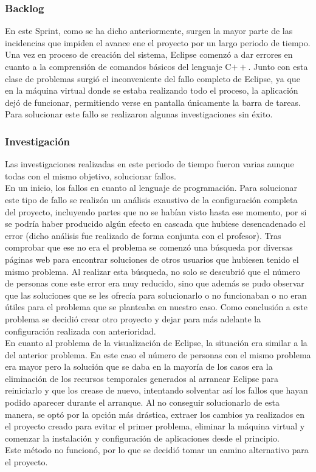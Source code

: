 \subsubsection{Backlog}
En este Sprint, como se ha dicho anteriormente, surgen la mayor parte de las incidencias que impiden el avance ene el proyecto por un largo periodo de tiempo. Una vez en proceso de creación del sistema, Eclipse comenzó a dar errores en cuanto a la comprensión de comandos básicos del lenguaje C$++$. Junto con esta clase de problemas surgió el inconveniente del fallo completo de Eclipse, ya que en la máquina virtual donde se estaba realizando todo el proceso, la aplicación dejó de funcionar, permitiendo verse en pantalla únicamente la barra de tareas. Para solucionar este fallo se realizaron algunas investigaciones sin éxito.\\
\subsubsection{Investigación}
Las investigaciones realizadas en este periodo de tiempo fueron varias aunque todas con el mismo objetivo, solucionar fallos.\\
En un inicio, los fallos en cuanto al lenguaje de programación. Para solucionar este tipo de fallo se realizón un análisis exaustivo de la configuración completa  del proyecto, incluyendo partes que no se habían visto hasta ese momento, por si se podría haber producido algún efecto en cascada que hubiese desencadenado el error (dicho análisis fue realizado de forma conjunta con el profesor). Tras comprobar que ese no era el problema se comenzó una búsqueda por diversas páginas web para encontrar soluciones de otros usuarios que hubiesen tenido el mismo problema. Al realizar esta búsqueda, no solo se descubrió que el número de personas cone este error era muy reducido, sino que además se pudo observar que las soluciones que se les ofrecía para solucionarlo o no funcionaban o no eran útiles para el problema que se planteaba en nuestro caso. Como conclusión a este problema se decidió crear otro proyecto y dejar para más adelante la configuración realizada con anterioridad.\\
En cuanto al problema de la visualización de Eclipse, la situación era similar a la del anterior problema. En este caso el número de personas con el mismo problema era mayor pero la solución que se daba en la mayoría de los casos era la eliminación de los recursos temporales generados al arrancar Eclipse para reiniciarlo y que los crease de nuevo, intentando solventar así los fallos que hayan podido aparecer durante el arranque. Al no conseguir solucionarlo de esta manera, se optó por la opción más drástica, extraer los cambios ya realizados en el proyecto creado para evitar el primer problema, eliminar la máquina virtual y comenzar la instalación y configuración de aplicaciones desde el principio.\\
Este método no funcionó, por lo que se decidió tomar un camino alternativo para el proyecto.

